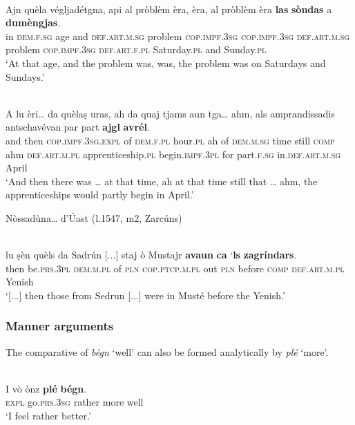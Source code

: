\ea\label{}
\\
	\gll  Ajn quèla végljadétgna, api al pròblèm èra, èra, al pròblèm èra \textbf{las} \textbf{sòndas} a \textbf{dumèngjas}.   \\
	in  \textsc{dem.f.sg} age and \textsc{def.art.m.sg} problem \textsc{cop.impf.3sg} \textsc{cop.impf.3sg} \textsc{def.art.m.sg} problem \textsc{cop.impf.3sg} \textsc{def.art.f.pl} Saturday.\textsc{pl} and Sunday.\textsc{pl} \\
\glt `At that age, and the problem was, was, the problem was on Saturdays and Sundays.'
\z

\ea\label{}
\\
\gll A lu èri… da quèlaṣ uras, ah da quaj tjams aun tga… ahm, als amprandissadis antschavévan par part \textbf{ajgl} \textbf{avrél}.\\
and then \textsc{cop.impf.3sg.expl} of \textsc{dem.f.pl} hour.\textsc{pl} ah of \textsc{dem.m.sg} time still  \textsc{comp} ahm \textsc{def.art.m.pl} apprenticeship.\textsc{pl} begin.\textsc{impf.3pl} for part.\textsc{f.sg} in.\textsc{def.art.m.sg} April\\
\glt `And then there was … at that time, ah at that time still that … ahm, the apprenticeships would partly begin in April.'
\z

 Nòssadùna… d’Úast (l.1547, m2, Zarcúns)
 


\ea
\label{}
 {\citealt[132]{Büchli1966}}\\
\gll [...] lu ṣèn quèls da Sadrún [...] staj ò Mustajr \textbf{avaun} \textbf{ca} `\textbf{ls} \textbf{zagríndars}.\\
{} then be.\textsc{prs.3pl} \textsc{dem.m.pl} of \textsc{pln} {} \textsc{cop.ptcp.m.pl} out \textsc{pln} before \textsc{comp} \textsc{def.art.m.pl} Yenish\\
\glt `[...] then those from Sedrun [...] were in Musté before the Yenish.'
\z




\subsubsection{Manner arguments}

The comparative of \textit{bégn} `well' can also be formed analytically by \textit{plé} `more'.

\ea\label{}
\\
\gll  I vò ònz \textbf{plé} \textbf{bégn}. \\
     \textsc{expl} go.\textsc{prs.3sg} rather more well\\
\glt `I feel rather better.'
\z


